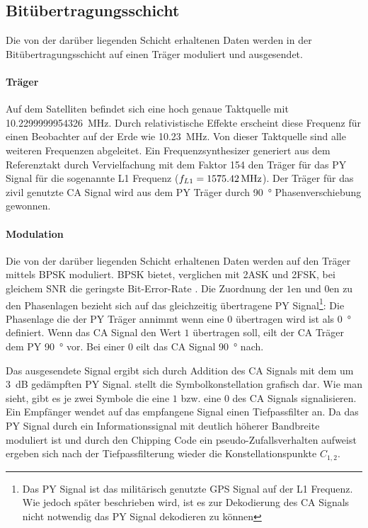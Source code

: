 \subsection{Bitübertragungsschicht}
Die von der darüber liegenden Schicht erhaltenen Daten werden in der Bitübertragungsschicht auf einen Träger moduliert und ausgesendet. 

\paragraph{Träger} 
Auf dem Satelliten befindet sich eine hoch genaue Taktquelle mit \SI{10.2299999954326}{\MHz}. Durch relativistische Effekte erscheint diese Frequenz für einen Beobachter auf der Erde wie \SI{10.23}{\MHz}. Von dieser Taktquelle sind alle weiteren Frequenzen abgeleitet. Ein Frequenzsynthesizer generiert aus dem Referenztakt durch Vervielfachung mit dem Faktor 154 den Träger für das \gls{PY} Signal für die sogenannte L1 Frequenz ($\gpsfcarr=\SI{1575.42}{\MHz}$). Der Träger für das zivil genutzte \gls{CA} Signal wird aus dem \gls{PY} Träger durch \SI{90}{\degree} Phasenverschiebung gewonnen.

\paragraph{Modulation}
Die von der darüber liegenden Schicht erhaltenen Daten werden auf den Träger mittels \gls{BPSK} moduliert. \gls{BPSK} bietet, verglichen mit 2ASK und 2FSK, bei gleichem \gls{SNR} die geringste Bit-Error-Rate \cite{dixon1998radio}. Die Zuordnung der $1$en und $0$en zu den Phasenlagen bezieht sich auf das gleichzeitig übertragene \gls{PY} Signal\footnote{Das \gls{PY} Signal ist das militärisch genutzte GPS Signal auf der L1 Frequenz. Wie jedoch später beschrieben wird, ist es zur Dekodierung des \gls{CA} Signals nicht notwendig das \gls{PY} Signal dekodieren zu können}: Die Phasenlage die der \gls{PY} Träger annimmt wenn eine $0$ übertragen wird ist als \SI{0}{\degree} definiert. Wenn das \gls{CA} Signal den Wert $1$ übertragen soll, eilt der \gls{CA} Träger dem \gls{PY} \SI{90}{\degree} vor. Bei einer $0$ eilt das CA Signal \SI{90}{\degree} nach.

Das ausgesendete Signal ergibt sich durch Addition des \gls{CA} Signals mit dem um \SI{3}{\dB} gedämpften \gls{PY} Signal.  stellt die Symbolkonstellation grafisch dar. Wie man sieht, gibt es je zwei Symbole die eine $1$ bzw. eine $0$ des \gls{CA} Signals signalisieren. Ein Empfänger wendet auf das empfangene Signal einen Tiefpassfilter an. Da das \gls{PY} Signal durch ein Informationssignal mit deutlich höherer Bandbreite moduliert ist und durch den Chipping Code ein pseudo-Zu\-falls\-ver\-hal\-ten aufweist ergeben sich nach der Tiefpassfilterung wieder die Konstellationspunkte $C_{1,2}$.

